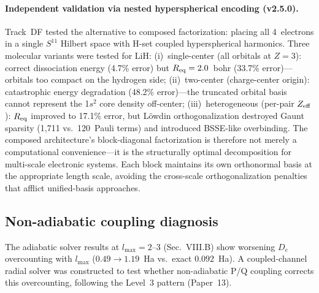 \documentclass[aps,pra,twocolumn,superscriptaddress,longbibliography,floatfix]{revtex4-2}
\begin{document}
\paragraph{Independent validation via nested hyperspherical encoding
(v2.5.0).}
Track~DF tested the alternative to composed factorization: placing all
4~electrons in a single $S^{11}$ Hilbert space with H-set coupled
hyperspherical harmonics.  Three molecular variants were tested for LiH:
(i)~single-center (all orbitals at $Z = 3$): correct dissociation energy
(4.7\% error) but $R_{\rm eq} = 2.0$~bohr (33.7\% error)---orbitals
too compact on the hydrogen side;
(ii)~two-center (charge-center origin): catastrophic energy degradation
(48.2\% error)---the truncated orbital basis cannot represent the
1$s^2$ core density off-center;
(iii)~heterogeneous (per-pair $Z_{\rm eff}$): $R_{\rm eq}$ improved to
17.1\% error, but L\"owdin orthogonalization destroyed Gaunt sparsity
(1{,}711 vs.\ 120~Pauli terms) and introduced BSSE-like overbinding.
The composed architecture's block-diagonal factorization is therefore
not merely a computational convenience---it is the structurally optimal
decomposition for multi-scale electronic systems.  Each block maintains
its own orthonormal basis at the appropriate length scale, avoiding the
cross-scale orthogonalization penalties that afflict unified-basis
approaches.

\subsection{Non-adiabatic coupling diagnosis}

The adiabatic solver results at $l_{\max} = 2$--$3$ (Sec.~VIII.B)
show worsening $D_e$ overcounting with $l_{\max}$ ($0.49 \to
1.19$~Ha vs.\ exact $0.092$~Ha).  A coupled-channel radial solver
was constructed to test whether non-adiabatic P/Q coupling corrects
this overcounting, following the Level~3 pattern (Paper~13).
\end{document}
